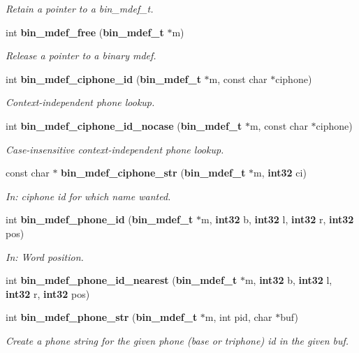 \begin{DoxyCompactItemize}
\begin{DoxyCompactList}\small\item\em \-Retain a pointer to a bin\-\_\-mdef\-\_\-t. \end{DoxyCompactList}\item 
int {\bf bin\-\_\-mdef\-\_\-free} ({\bf bin\-\_\-mdef\-\_\-t} $\ast$m)\label{bin__mdef_8h_afe7ed87e2a2d22b228c14ed8225e4b2c}

\begin{DoxyCompactList}\small\item\em \-Release a pointer to a binary mdef. \end{DoxyCompactList}\item 
int {\bf bin\-\_\-mdef\-\_\-ciphone\-\_\-id} ({\bf bin\-\_\-mdef\-\_\-t} $\ast$m, const char $\ast$ciphone)
\begin{DoxyCompactList}\small\item\em \-Context-\/independent phone lookup. \end{DoxyCompactList}\item 
int {\bf bin\-\_\-mdef\-\_\-ciphone\-\_\-id\-\_\-nocase} ({\bf bin\-\_\-mdef\-\_\-t} $\ast$m, const char $\ast$ciphone)
\begin{DoxyCompactList}\small\item\em \-Case-\/insensitive context-\/independent phone lookup. \end{DoxyCompactList}\item 
const char $\ast$ {\bf bin\-\_\-mdef\-\_\-ciphone\-\_\-str} ({\bf bin\-\_\-mdef\-\_\-t} $\ast$m, {\bf int32} ci)
\begin{DoxyCompactList}\small\item\em \-In\-: ciphone id for which name wanted. \end{DoxyCompactList}\item 
int {\bf bin\-\_\-mdef\-\_\-phone\-\_\-id} ({\bf bin\-\_\-mdef\-\_\-t} $\ast$m, {\bf int32} b, {\bf int32} l, {\bf int32} r, {\bf int32} pos)
\begin{DoxyCompactList}\small\item\em \-In\-: \-Word position. \end{DoxyCompactList}\item 
int {\bfseries bin\-\_\-mdef\-\_\-phone\-\_\-id\-\_\-nearest} ({\bf bin\-\_\-mdef\-\_\-t} $\ast$m, {\bf int32} b, {\bf int32} l, {\bf int32} r, {\bf int32} pos)\label{bin__mdef_8h_a155bcd77cd4cd26d15c857b999a1fdae}

\item 
int {\bf bin\-\_\-mdef\-\_\-phone\-\_\-str} ({\bf bin\-\_\-mdef\-\_\-t} $\ast$m, int pid, char $\ast$buf)
\begin{DoxyCompactList}\small\item\em \-Create a phone string for the given phone (base or triphone) id in the given buf. \end{DoxyCompactList}\end{DoxyCompactItemize}
